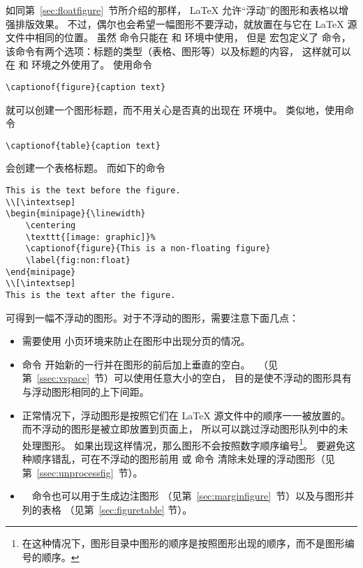 如同第~\ref{sec:floatfigure}~节所介绍的那样，
\LaTeX{} 允许“浮动”的图形和表格以增强排版效果。
不过，偶尔也会希望一幅图形不要浮动，就放置在与它在 \LaTeX{} 源文件中相同的位置。
虽然  命令只能在  和  环境中使用，
但是  宏包定义了  命令，
该命令有两个选项：标题的类型（表格、图形等）以及标题的内容，
这样就可以在  和  环境之外使用了。
使用命令
\begin{lstlisting}
\captionof{figure}{caption text}
\end{lstlisting}
就可以创建一个图形标题，而不用关心是否真的出现在  环境中。
类似地，使用命令
\begin{lstlisting}
\captionof{table}{caption text}
\end{lstlisting}
会创建一个表格标题。
而如下的命令
\begin{lstlisting}
This is the text before the figure.
\\[\intextsep]
\begin{minipage}{\linewidth}
	\centering
	\texttt{[image: graphic]}%
	\captionof{figure}{This is a non-floating figure}
	\label{fig:non:float}
\end{minipage}
\\[\intextsep]
This is the text after the figure.
\end{lstlisting}
可得到一幅不浮动的图形。对于不浮动的图形，需要注意下面几点：
\begin{itemize}
	\item 需要使用  小页环境来防止在图形中出现分页的情况。
	\item 命令  开始新的一行并在图形的前后加上垂直的空白。
	~（见第~\ref{ssec:vspace}~节）可以使用任意大小的空白，
	目的是使不浮动的图形具有与浮动图形相同的上下间距。
	\item 正常情况下，浮动图形是按照它们在 \LaTeX{} 源文件中的顺序一一被放置的。
	而不浮动的图形是被立即放置到页面上，
	所以可以跳过浮动图形队列中的未处理图形。
	如果出现这样情况，那么图形不会按照数字顺序编号\footnote{
		在这种情况下，图形目录中图形的顺序是按照图形出现的顺序，而不是图形编号的顺序。}。
	要避免这种顺序错乱，可在不浮动的图形前用  或  命令
	清除未处理的浮动图形（见第~\ref{ssec:unprocessfig}~节）。
	\item {}　命令也可以用于生成边注图形
	（见第~\ref{sec:marginfigure}~节）以及与图形并列的表格
	（见第~\ref{sec:figuretable} 节）。
\end{itemize}

